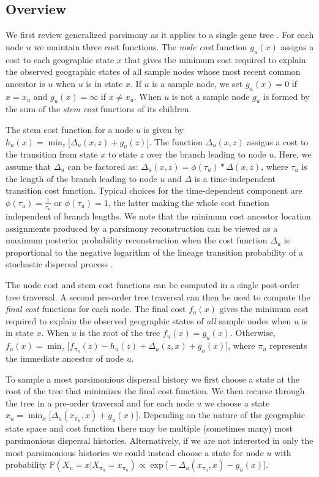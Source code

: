 \subsection{Overview}

We first review generalized parsimony as it applies to a single gene tree
\cite{Sankoff_1975, Sankoff_Rousseau_1975}. For each node $u$ we maintain
three cost functions. The \textit{node cost} function $g_u(x)$ assigns a cost 
to each geographic state $x$ that gives the minimum cost required to explain 
the observed geographic states of all sample nodes whose most recent common 
ancestor is $u$ when $u$ is in state  $x$. If $u$ is a sample node, we set 
$g_u(x) = 0$ if $x = x_u$ and $g_u(x) = \infty$ if $x \neq x_u$. When $u$ is 
not a sample node $g_u$ is formed by the sum of the \textit{stem cost} 
functions of its children.

The stem cost function for a node $u$ is given by
%
$h_u(x) = \min_z \bigl[ \Delta_u(x, z) + g_u(z) \bigr]$.
%
The function $\Delta_u(x, z)$ assigns a cost to the transition from state $x$ to
state $z$ over the branch leading to node $u$. Here, we assume that $\Delta_u$
can be factored as:
%
$\Delta_u(x,z) = \phi(\tau_u) * \Delta(x,z)$,
%
where $\tau_u$ is the length of the branch leading to node $u$ and $\Delta$ is
a time-independent transition cost function. Typical choices for the
time-dependent component are $\phi(\tau_u) = \frac{1}{\tau_u}$ or 
$\phi(\tau_u) = 1$, the latter making the whole cost function independent of
branch lengths. We note that the minimum cost ancestor location assignments
produced by a parsimony reconstruction can be viewed as a maximum posterior
probability reconstruction when the cost function $\Delta_u$ is proportional 
to the negative logarithm of the lineage transition probability of a stochastic
dispersal process \cite{Maddison_1991}.

The node cost and stem cost functions can be computed in a single post-order
tree traversal. A second pre-order tree traversal can then be used to compute
the \textit{final cost} functions for each node. The final cost $f_u(x)$
gives the minimum cost required to explain the observed geographic states of
\emph{all} sample nodes when $u$ is in state $x$. When $u$ is the root of the
tree $f_u(x) = g_u(x)$. Otherwise, 
%
$f_u(x) = \min_z \bigl[ f_{\pi_u}(z) - h_u(z) + \Delta_u(z,x) + g_u(x) \bigr]$,
%
where $\pi_u$ represents the immediate ancestor of node $u$.

To sample a most parsimonious dispersal history we first choose a state at the
root of the tree that minimizes the final cost function. We then recurse through 
the tree in a pre-order traversal and for each node $u$ we choose a state
$x_u = \min_x \bigl[\Delta_u(x_{\pi_u}, x) + g_u(x)\bigr]$. Depending on the
nature of the geographic state space and cost function there may be multiple
(sometimes many) most parsimonious dispersal histories. Alternatively, if we
are not interested in only the most parsimonious histories we could instead 
choose a state for node $u$ with probability 
$\mathbb{P}(X_u = x | X_{\pi_u} = x_{\pi_u}) \propto \exp{\bigl[-\Delta_u(x_{\pi_u}, x) - g_u(x)\bigr]}$.

